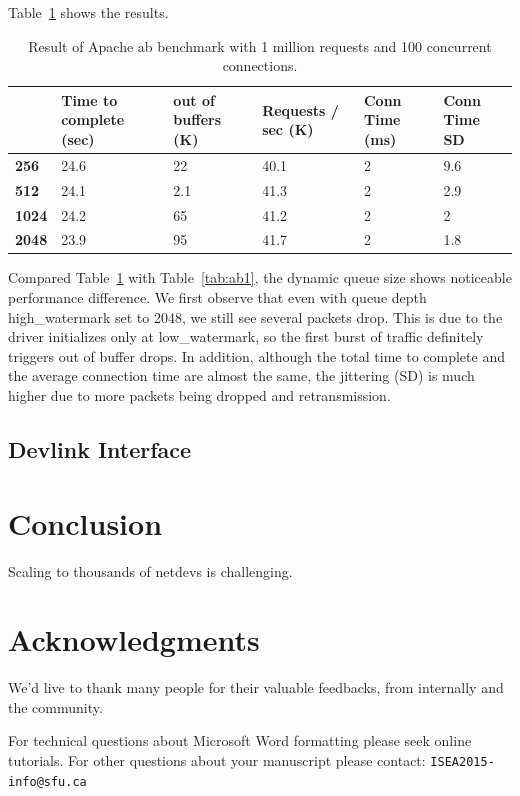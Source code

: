 \documentclass[letterpaper]{article}
\begin{document}
Table~\ref{tab:ab2} shows the results.
\begin{table}[h!]
\centering
\footnotesize
\begin{tabular}{|p{0.6cm}|p{1.2cm}|p{1.2cm}|p{1.2cm}|p{0.8cm}|p{1cm}|} \hline
\textbf{} & \textbf{Time to complete (sec)} & \textbf{out of buffers (K)} & \textbf{Requests / sec (K)} & \textbf{Conn Time (ms)} & \textbf{Conn Time SD} \\ \hline \hline
\textbf{256}  & 24.6  & 22   & 40.1 & 2 & 9.6 \\ \hline
\textbf{512}  & 24.1  & 2.1  & 41.3 & 2 & 2.9 \\ \hline
\textbf{1024} & 24.2  & 65   & 41.2 & 2 & 2   \\ \hline
\textbf{2048} & 23.9  & 95   & 41.7 & 2 & 1.8 \\ \hline
\end{tabular}
\caption{Result of Apache ab benchmark with 1 million requests and 100 concurrent connections.}
\label{tab:ab2}
\end{table}

Compared Table~\ref{tab:ab2} with Table~\ref{tab:ab1}, the dynamic queue size shows noticeable
performance difference. We first observe that even with queue depth high\_watermark set to 2048,
we still see several packets drop. This is due to the driver initializes only at low\_watermark,
so the first burst of traffic definitely triggers out of buffer drops.
In addition, although the total time to complete and the average connection time are almost the
same, the jittering (SD) is much higher due to more packets being dropped and retransmission.

\subsection{Devlink Interface}



\section{Conclusion}
Scaling to thousands of netdevs is challenging.



\section{Acknowledgments}
We'd live to thank many people for their valuable feedbacks, from internally and the community.


For technical questions about Microsoft Word formatting please seek online tutorials. For other questions about your manuscript please contact: {\tt ISEA2015-info@sfu.ca}




\end{document}
